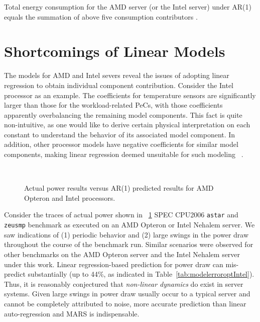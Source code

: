 Total energy consumption for the AMD server (or the Intel server)
under AR(1) equals the summation of above five consumption contributors
\cite{Lewis2008}.

\section{Shortcomings of Linear Models}
\label{sec:lineararshort}
The models for AMD and Intel severs reveal the issues of adopting linear
regression to obtain individual component contribution.  Consider the
Intel processor as an example.  The coefficients for temperature sensors
are significantly larger than those for the workload-related PeCs, with
those coefficients apparently overbalancing the remaining model
components.  This fact is quite non-intuitive, as one would like to
derive certain physical interpretation on each constant to understand
the behavior of its associated model component.  In addition, other
processor models have negative coefficients for similar model
components, making linear regression deemed unsuitable for such modeling
~\cite{Bertran2010,McCullough2011}.

\begin{figure}[tbhp]
  \centering
  \\
  \caption{Actual power results versus AR(1) predicted results for AMD Opteron
    and Intel processors.}
  \label{fig:comparear}
\end{figure}
Consider the traces of actual power shown in
\figurename~\ref{fig:comparear} SPEC CPU2006 \texttt{astar} and
\texttt{zeusmp} benchmark as executed on an AMD Opteron or Intel Nehalem
server.  We saw indications of (1) periodic behavior and (2) large
swings in the power draw throughout the course of the benchmark run.
Similar scenarios were observed for other benchmarks on the AMD Opteron
server and the Intel Nehalem server under this work.  Linear
regression-based prediction for power draw can mis-predict substantially
(up to 44\%, as indicated in Table~\ref{tab:modelerroroptIntel}).  Thus,
it is reasonably conjectured that \textit{non-linear dynamics} do exist
in server systems.  Given large swings in power draw usually occur to a
typical server and cannot be completely attributed to noise, more
accurate prediction than linear auto-regression and MARS
\cite{Friedman1991} is indispensable.

